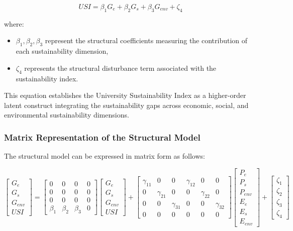 \documentclass[11pt,a4paper]{article}
\begin{document}
\begin{equation}
USI = \beta_1 G_e + \beta_2 G_s + \beta_3 G_{env} + \zeta_4
\end{equation}

where:

\begin{itemize}
\item $\beta_1, \beta_2, \beta_3$ represent the structural coefficients measuring the contribution of each sustainability dimension,
\item $\zeta_4$ represents the structural disturbance term associated with the sustainability index.
\end{itemize}

This equation establishes the University Sustainability Index as a higher-order latent construct integrating the sustainability gaps across economic, social, and environmental sustainability dimensions.

\subsubsection{Matrix Representation of the Structural Model}

The structural model can be expressed in matrix form as follows:

\begin{equation}
\begin{bmatrix}
G_e \\
G_s \\
G_{env} \\
USI
\end{bmatrix}
=
\begin{bmatrix}
0 & 0 & 0 & 0 \\
0 & 0 & 0 & 0 \\
0 & 0 & 0 & 0 \\
\beta_1 & \beta_2 & \beta_3 & 0
\end{bmatrix}
\begin{bmatrix}
G_e \\
G_s \\
G_{env} \\
USI
\end{bmatrix}
+
\begin{bmatrix}
\gamma_{11} & 0 & 0 & \gamma_{12} & 0 & 0 \\
0 & \gamma_{21} & 0 & 0 & \gamma_{22} & 0 \\
0 & 0 & \gamma_{31} & 0 & 0 & \gamma_{32} \\
0 & 0 & 0 & 0 & 0 & 0
\end{bmatrix}
\begin{bmatrix}
P_e \\
P_s \\
P_{env} \\
E_e \\
E_s \\
E_{env}
\end{bmatrix}
+
\begin{bmatrix}
\zeta_1 \\
\zeta_2 \\
\zeta_3 \\
\zeta_4
\end{bmatrix}
\end{equation}
\end{document}
